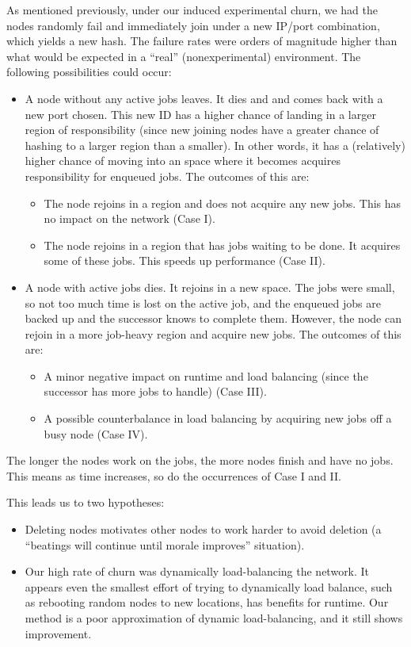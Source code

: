 As mentioned previously, under our induced experimental churn, we had the nodes randomly fail and immediately join under a new IP/port combination, which yields a new hash.
The failure rates were orders of magnitude higher than what would be expected in a ``real'' (nonexperimental) environment.
The following possibilities could occur:
\begin{itemize}
	\item A node without any active jobs leaves.
	It dies and and comes back with a new port chosen.
	This new ID has a higher chance of landing in a larger region of responsibility (since new joining nodes have a greater chance of hashing to a larger region than a smaller).
	In other words, it has a (relatively) higher chance of moving into an space where it becomes acquires responsibility for enqueued jobs.
	The outcomes of this are:
	\begin{itemize}
		\item The node rejoins in a region and does not acquire any new jobs.
		This has no impact on the network (Case I).
		\item The node rejoins in a region that has jobs waiting to be done.
		It acquires some of these jobs.
		This speeds up performance (Case II).
	\end{itemize}
	\item A node with active jobs dies.
	It rejoins in a new space.
	The jobs were small, so not too much time is lost on the active job, and the enqueued jobs are backed up and the successor knows to complete them.
	However, the node can rejoin in a more job-heavy region and acquire new jobs.
	The outcomes of this are:
	\begin{itemize}
		\item A minor negative impact on runtime and load balancing (since the successor has more jobs to handle) (Case III).
		\item A possible counterbalance in load balancing by acquiring new jobs off a busy node (Case IV).
	\end{itemize}
\end{itemize}

The longer the nodes work on the jobs, the more nodes finish and have no jobs.
This means as time increases, so do the occurrences of Case I and II.


This leads us to two hypotheses:
\begin{itemize}
	\item Deleting nodes motivates other nodes to work harder to avoid deletion (a ``beatings will continue until morale improves'' situation).
	\item Our high rate of churn was dynamically load-balancing the network.
	It appears even the smallest effort of trying to dynamically load balance, such as rebooting random nodes to new locations, has benefits for runtime.
	Our method is a poor approximation of dynamic load-balancing, and it still shows improvement.
\end{itemize}

